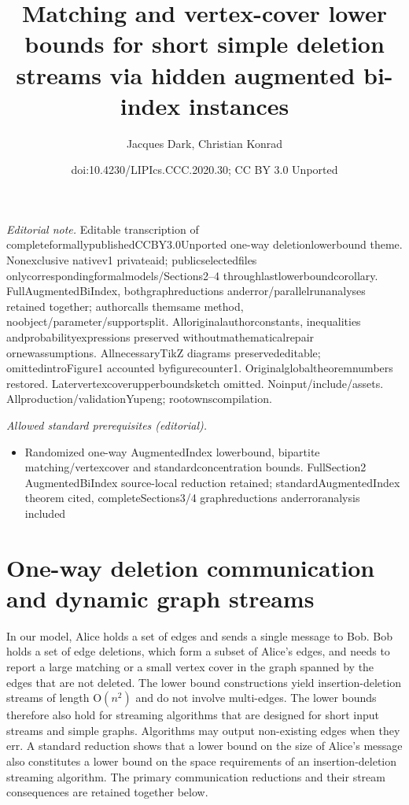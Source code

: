 \documentclass[10pt,a4paper]{article}
\title{Matching and vertex-cover lower bounds for short simple deletion streams via hidden augmented bi-index instances}
\author{Jacques Dark, Christian Konrad}
\date{doi:10.4230/LIPIcs.CCC.2020.30; CC BY 3.0 Unported}
\newcommand{\Order}{\mathrm O}
\begin{document}
\maketitle
\noindent\textit{Editorial note.} Editable transcription of completeformallypublishedCCBY3.0Unported one-way deletionlowerbound theme. Nonexclusive nativev1 privateaid; publicselectedfiles onlycorrespondingformalmodels/Sections2–4 throughlastlowerboundcorollary. FullAugmentedBiIndex, bothgraphreductions anderror/parallelrunanalyses retained together; authorcalls themsame method, noobject/parameter/supportsplit. Alloriginalauthorconstants, inequalities andprobabilityexpressions preserved withoutmathematicalrepair ornewassumptions. AllnecessaryTikZ diagrams preservededitable; omittedintroFigure1 accounted byfigurecounter1. Originalglobaltheoremnumbers restored. Latervertexcoverupperboundsketch omitted. Noinput/include/assets. Allproduction/validationYupeng; rootownscompilation.\par\medskip
\noindent\textit{Allowed standard prerequisites (editorial).}\begin{itemize}
\item Randomized one-way AugmentedIndex lowerbound, bipartite matching/vertexcover and standardconcentration bounds. FullSection2 AugmentedBiIndex source-local reduction retained; standardAugmentedIndex theorem cited, completeSections3/4 graphreductions anderroranalysis included
\end{itemize}\medskip
\section*{One-way deletion communication and dynamic graph streams}
In our model, Alice holds a set of edges and sends a single message to Bob. Bob holds a set of edge deletions, which form a subset of Alice's edges, and needs to report a large matching or a small vertex cover in the graph spanned by the edges that are not deleted.
The lower bound constructions yield insertion-deletion streams of length $\Order(n^2)$ and do not involve multi-edges. The lower bounds therefore also hold for streaming algorithms that are designed for short input streams and simple graphs. Algorithms may output non-existing edges when they err.
A standard reduction shows that a lower bound on the size of Alice's message also constitutes a lower bound on the space requirements of an insertion-deletion streaming algorithm. The primary communication reductions and their stream consequences are retained together below.
\end{document}
